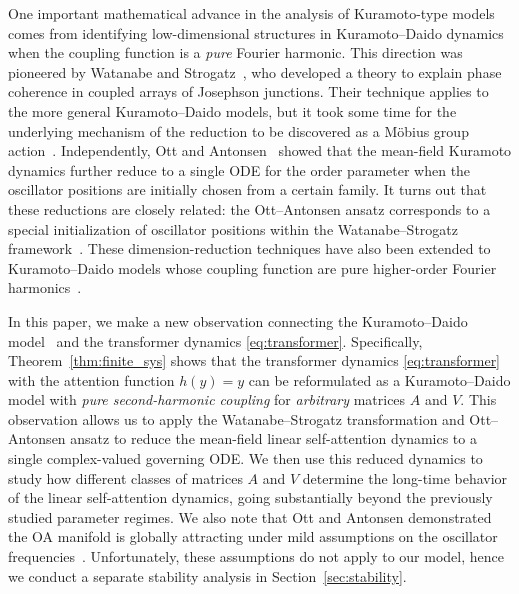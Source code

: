 \documentclass[10pt]{article}
\theoremstyle{definition}
\theoremstyle{definition}
\numberwithin{equation}{section}
\begin{document}
One important mathematical advance in the analysis of Kuramoto-type models comes from identifying low-dimensional structures in Kuramoto--Daido dynamics when the coupling function is a \emph{pure} Fourier harmonic.
This direction was pioneered by Watanabe and Strogatz~\cite{watanabe_integrability}, who developed a theory to explain phase coherence in coupled arrays of Josephson junctions.  
Their technique applies to the more general Kuramoto--Daido models, but it took some time for the underlying mechanism of the reduction to be discovered as a M\"obius group action~\cite{marvel2009identical}.
Independently, Ott and Antonsen~\cite{ott2008low,Ott_2009} showed that the mean-field Kuramoto dynamics further reduce to a single ODE for the order parameter when the oscillator positions are initially chosen from a certain family.
It turns out that these reductions are closely related: the Ott--Antonsen ansatz corresponds to a special initialization of oscillator positions within the Watanabe--Strogatz framework~\cite{marvel2009identical}.
These dimension-reduction techniques have also been extended to Kuramoto--Daido models whose coupling function are pure higher-order Fourier harmonics~\cite{skardal2011cluster,Gong_2019}.

In this paper, we make a new observation connecting the Kuramoto--Daido model~\cite{daido1992order} and the transformer dynamics \eqref{eq:transformer}.
Specifically, Theorem~\ref{thm:finite_sys} shows that the transformer dynamics \eqref{eq:transformer} with the attention function $h(y) = y$ can be reformulated as a Kuramoto--Daido model with \emph{pure second-harmonic coupling} for \emph{arbitrary} matrices $A$ and $V$.
This observation allows us to apply the Watanabe--Strogatz transformation and Ott--Antonsen ansatz to reduce the mean-field linear self-attention dynamics to a single complex-valued governing ODE. We then use this reduced dynamics to study how different classes of matrices $A$ and $V$ determine the long-time behavior of the linear self-attention dynamics, going substantially beyond the previously studied parameter regimes.  We also note that Ott and Antonsen demonstrated the OA manifold is globally attracting under mild assumptions on the oscillator frequencies~\cite{Ott_2009}.  Unfortunately, these assumptions do not apply to our model, hence we conduct a separate stability analysis in Section~\ref{sec:stability}.


\end{document}
